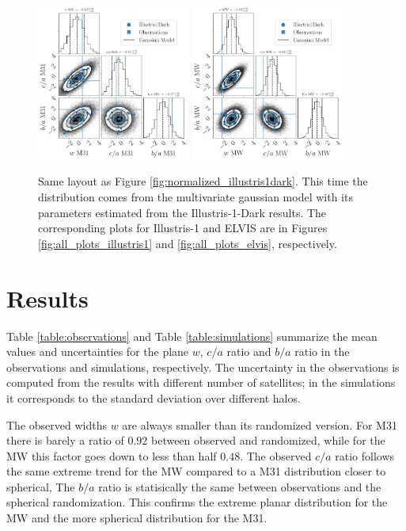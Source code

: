 \documentclass[a4paper,fleqn,usenatbib]{mnras}
\begin{document}
\begin{figure}
\centering
\includegraphics[width=0.45\textwidth]{gaussian_model_illustris1dark_M31_n_11.pdf}
\includegraphics[width=0.45\textwidth]{gaussian_model_illustris1dark_MW_n_11.pdf}
\caption{
Same layout as Figure \ref{fig:normalized_illustris1dark}. 
This time the distribution comes from the multivariate gaussian model 
with its parameters estimated from the Illustris-1-Dark results.
The corresponding plots for Illustris-1 and ELVIS are
in Figures \ref{fig:all_plots_illustris1} and \ref{fig:all_plots_elvis},
respectively. \label{fig:gaussian_illustris1dark}}     
\end{figure}


\section{Results}
\label{sec:results}

Table \ref{table:observations} and Table \ref{table:simulations}
summarize the mean values and uncertainties for the plane $w$, $c/a$
ratio and $b/a$ ratio in the observations and simulations, respectively. 
The uncertainty in the observations is computed from the results with
different number of satellites; in the simulations it corresponds to
the standard deviation over different halos.  

The observed widths $w$ are always smaller than its randomized version.
For M31 there is barely a ratio of $0.92$ between observed and
randomized, while for the MW this factor goes down to less than half
$0.48$. 
The observed $c/a$ ratio follows the same extreme trend for
the MW compared to a M31 distribution closer to spherical, 
The $b/a$ ratio is statisically the same between observations and the
spherical randomization. 
This confirms the extreme planar distribution for the MW and the more
spherical distribution for the M31.
\end{document}
